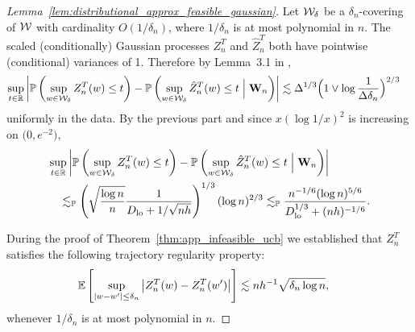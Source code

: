 \begin{proof}[Lemma~\ref{lem:distributional_approx_feasible_gaussian}]

  Let $\mathcal{W}_\delta$ be a $\delta_n$-covering of $\mathcal{W}$
  with cardinality $O(1/\delta_n)$,
  where $1/\delta_n$ is at most polynomial in $n$.
  The scaled (conditionally) Gaussian
  processes $Z_n^T$ and $\hat Z_n^T$
  both have pointwise (conditional) variances of 1.
  Therefore by Lemma~3.1 in \citet{chernozhukov2013gaussian},
  \begin{align*}
    \sup_{t \in \mathbb{R}}
    \left|
    \mathbb{P}\left(
      \sup_{w \in \mathcal{W}_\delta}
      Z_n^T(w)
      \leq t
    \right)
    - \mathbb{P}\left(
      \sup_{w \in \mathcal{W}_\delta}
      \hat Z_n^T(w)
      \leq t
      \Bigm\vert \mathbf{W}_n
    \right)
    \right|
    &\lesssim
    \Delta^{1/3}
    \Big(
      1 \vee \log \frac{1}{\Delta \delta_n}
    \Big)^{2/3}
  \end{align*}
  uniformly in the data. By the previous part and
  since $x (\log 1/x)^2$ is increasing on $\big(0, e^{-2}\big)$,
  \begin{align*}
    &\sup_{t \in \mathbb{R}}
    \left|
    \mathbb{P}\left(
      \sup_{w \in \mathcal{W}_\delta}
      Z_n^T(w)
      \leq t
    \right)
    - \mathbb{P}\left(
      \sup_{w \in \mathcal{W}_\delta}
      \hat Z_n^T(w)
      \leq t
      \Bigm\vert \mathbf{W}_n
    \right)
    \right| \\
    &\quad\lesssim_{\mathbb{P}}
    \left(
      \sqrt{\frac{\log n}{n}}
      \frac{1}{D_{\textup{lo}} + 1/\sqrt{n h}}
    \right)^{1/3}
    (\log n)^{2/3}
    \lesssim_{\mathbb{P}}
    \frac{n^{-1/6}(\log n)^{5/6}}
    {D_{\textup{lo}}^{1/3} + (n h)^{-1/6}}.
  \end{align*}


  During the proof of
  Theorem~\ref{thm:app_infeasible_ucb}
  we established that
  $Z_n^T$ satisfies the following
  trajectory regularity property:
  \begin{align*}
    \mathbb{E}\left[
      \sup_{|w-w'| \leq \delta_n}
      \big| Z_n^T(w) - Z_n^T(w') \big|
    \right]
    &\lesssim
    n h^{-1}
    \sqrt{\delta_n \log n},
  \end{align*}
  whenever $1/\delta_n$
  is at most polynomial in $n$.



\end{proof}
